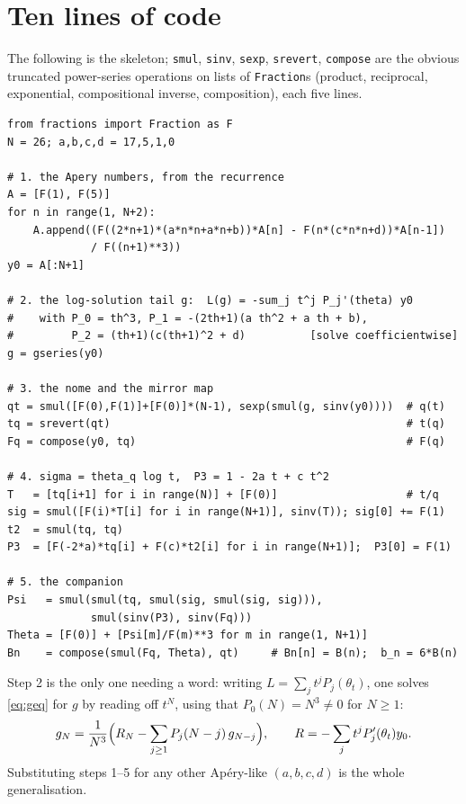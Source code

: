 \documentclass[11pt,reqno]{amsart}
\theoremstyle{plain}
\theoremstyle{definition}
\theoremstyle{remark}
\newcommand{\ta}{\theta_t}
\numberwithin{equation}{section}
\begin{document}
\appendix

\section{Ten lines of code}

The following is the skeleton; \texttt{smul}, \texttt{sinv}, \texttt{sexp},
\texttt{srevert}, \texttt{compose} are the obvious truncated power-series
operations on lists of \texttt{Fraction}s (product, reciprocal, exponential,
compositional inverse, composition), each five lines.

\begin{small}
\begin{verbatim}
from fractions import Fraction as F
N = 26; a,b,c,d = 17,5,1,0

# 1. the Apery numbers, from the recurrence
A = [F(1), F(5)]
for n in range(1, N+2):
    A.append((F((2*n+1)*(a*n*n+a*n+b))*A[n] - F(n*(c*n*n+d))*A[n-1])
             / F((n+1)**3))
y0 = A[:N+1]

# 2. the log-solution tail g:  L(g) = -sum_j t^j P_j'(theta) y0
#    with P_0 = th^3, P_1 = -(2th+1)(a th^2 + a th + b),
#         P_2 = (th+1)(c(th+1)^2 + d)          [solve coefficientwise]
g = gseries(y0)

# 3. the nome and the mirror map
qt = smul([F(0),F(1)]+[F(0)]*(N-1), sexp(smul(g, sinv(y0))))  # q(t)
tq = srevert(qt)                                              # t(q)
Fq = compose(y0, tq)                                          # F(q)

# 4. sigma = theta_q log t,  P3 = 1 - 2a t + c t^2
T   = [tq[i+1] for i in range(N)] + [F(0)]                    # t/q
sig = smul([F(i)*T[i] for i in range(N+1)], sinv(T)); sig[0] += F(1)
t2  = smul(tq, tq)
P3  = [F(-2*a)*tq[i] + F(c)*t2[i] for i in range(N+1)];  P3[0] = F(1)

# 5. the companion
Psi   = smul(smul(tq, smul(sig, smul(sig, sig))),
             smul(sinv(P3), sinv(Fq)))
Theta = [F(0)] + [Psi[m]/F(m)**3 for m in range(1, N+1)]
Bn    = compose(smul(Fq, Theta), qt)     # Bn[n] = B(n);  b_n = 6*B(n)
\end{verbatim}
\end{small}

\noindent Step 2 is the only one needing a word: writing $L=\sum_jt^jP_j(\ta)$,
one solves \eqref{eq:geq} for $g$ by reading off $t^N$, using that $P_0(N)=N^3
\ne0$ for $N\ge1$:
\[
  g_N=\frac{1}{N^3}\Bigl(R_N-\sum_{j\ge1}P_j(N-j)\,g_{N-j}\Bigr),
  \qquad
  R=-\sum_j t^jP_j'(\ta)y_0 .
\]
Substituting steps 1--5 for any other Ap\'ery-like $(a,b,c,d)$ is the whole
generalisation.
\end{document}
